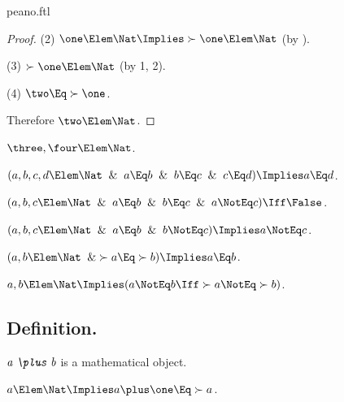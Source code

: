 \documentclass{stex}
\begin{document}
\begin{smodule}{peano.ftl}
\begin{forthel}
\begin{proof}
    (2) $\one \Elem \Nat \Implies \succ{\one} \Elem \Nat$ (by ).

    (3) $\succ{\one} \Elem \Nat$ (by 1, 2).

    (4) $\two \Eq \succ{\one}$.

    Therefore $\two \Elem \Nat$.
  \end{proof}

  \begin{theorem*}[title=12,name=P12]
    $\three,\four \Elem \Nat$.
  \end{theorem*}

  \begin{theorem*}[title=13,name=P13]
    $(a,b,c,d \Elem \Nat \And a \Eq b \And b \Eq c \And c \Eq d) \Implies a \Eq d$.
  \end{theorem*}

  \begin{theorem*}[title=14,name=P14]
    $(a,b,c \Elem \Nat \And a \Eq b \And b \Eq c \And a \NotEq c) \Iff \False$.
  \end{theorem*}

  \begin{theorem*}[title=15,name=P15]
    $(a,b,c \Elem \Nat \And a \Eq b \And b \NotEq c) \Implies a \NotEq c$.
  \end{theorem*}

  \begin{theorem*}[title=16,name=P16]
    $(a,b \Elem \Nat \And \succ{a} \Eq \succ{b}) \Implies a \Eq b$.
  \end{theorem*}

  \begin{theorem*}[title=17,name=P17]
    $a,b \Elem \Nat \Implies (a \NotEq b \Iff \succ{a} \NotEq \succ{b})$.
  \end{theorem*}
\end{forthel}


\subsection{Definition.}


\begin{forthel}
  \begin{signature*}[for=plus]
    $\emph{a \plus b}$ is a mathematical object.
  \end{signature*}

  \begin{axiom*}
    $a \Elem \Nat \Implies a \plus \one \Eq \succ{a}$.
  \end{axiom*}


\end{forthel}
\end{smodule}
\end{document}
